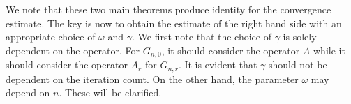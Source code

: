 \begin{itemize}

We note that these two main theorems produce identity for the convergence estimate. The key is now to obtain the estimate of the right hand side with an appropriate choice of $\omega$ and $\gamma$. We first note that the choice of $\gamma$ is solely dependent on the operator. For $G_{n,0}$, it should consider the operator $A$ while it should consider the operator $A_r$ for $G_{n,r}$. It is evident that $\gamma$ should not be dependent on the iteration count. On the other hand, the parameter $\omega$ may depend on $n$. These will be clarified. 


\end{itemize}
